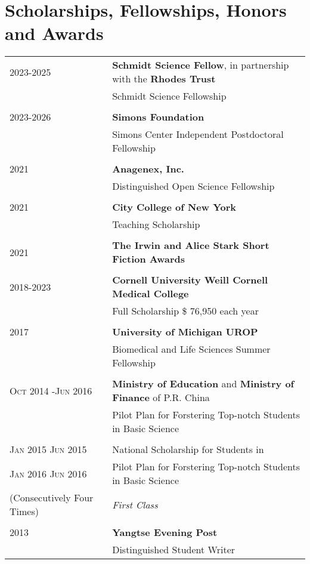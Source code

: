 \section{Scholarships, Fellowships, Honors and Awards}
\begin{longtable}{p{} p{} }
2023-2025 & \textbf{Schmidt Science Fellow}, in partnership with the \textbf{Rhodes Trust} \\
& Schmidt Science Fellowship\\\\

2023-2026 & \textbf{Simons Foundation}\\
& Simons Center Independent Postdoctoral Fellowship \\\\

2021 & \textbf{Anagenex, Inc.}\\
& Distinguished Open Science Fellowship \\\\

2021 & \textbf{City College of New York}\\
& Teaching Scholarship \\\\

2021 & \textbf{The Irwin and Alice Stark Short Fiction Awards}\\\\

2018-2023 & \textbf{Cornell University Weill Cornell Medical College}\\
     & Full Scholarship \$ 76,950 each year \\\\

\textsc{2017} & \textbf{University of Michigan UROP} \\ &  Biomedical and Life Sciences Summer Fellowship\\\\

\textsc{Oct 2014 -Jun 2016} & \textbf{Ministry of Education} and  \textbf{Ministry of Finance} of P.R. China \\ &Pilot Plan for Forstering Top-notch Students in Basic Science \\\\
 \textsc{Jan} 2015 \textsc{Jun} 2015 & National Scholarship for Students in \\ \textsc{Jan} 2016 \textsc{Jun} 2016 & Pilot Plan for Forstering Top-notch Students in Basic Science \\ \footnotesize(Consecutively Four Times) & \emph{First Class}\\\\
 \textsc 2013 &\textbf{Yangtse Evening Post} \\& Distinguished Student Writer\\
\end{longtable}


